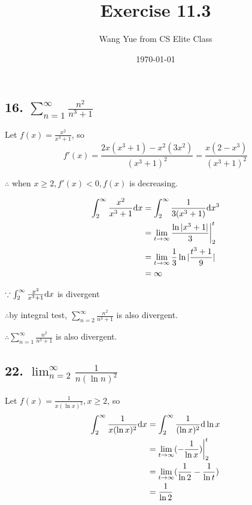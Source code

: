 \documentclass{article}
\begin{document}
    \title{Exercise 11.3}
    \author{Wang Yue from CS Elite Class}
    \date{\today}

    \maketitle

    \subsection*{16. $\sum_{n=1}^\infty \frac{n^2}{n^3+1}$}

    Let $f(x) = \frac{x^2}{x^3+1}$, so $$f'(x) = \frac{2x(x^3+1) - x^2(3x^2)}{(x^3+1)^2} = \frac{x(2-x^3)}{(x^3+1)^2}$$

    $\therefore$ when $x\geq 2, f'(x)<0, f(x)$ is decreasing.

    $$\begin{aligned}
    \int_2^\infty \frac{x^2}{x^3+1}\textrm dx &= \int_2^\infty \frac{1}{3(x^3+1)}\textrm dx^3 \\
    &= \lim_{t\to\infty}\frac{\ln|x^3+1|}{3}\biggl|_2^t \\
    &= \lim_{t\to\infty} \frac{1}{3} \ln |\frac{t^3+1}{9}| \\
    &= \infty
    \end{aligned}$$

    $\because \int_2^\infty \frac{x^2}{x^3+1}\textrm dx$ is divergent

    $\therefore $by integral test, $\sum_{n=2}^\infty \frac{n^2}{n^3+1}$ is also divergent.

    $\therefore \sum_{n=1}^\infty \frac{n^2}{n^3+1}$ is also divergent.

    \subsection*{22. $\lim_{n=2}^\infty \frac{1}{n(\ln n)^2}$}

    Let $f(x) = \frac{1}{x(\ln x)^2}, x \geq 2$, so 
    $$\begin{aligned}
        \int_2^\infty \frac{1}{x(\ln x)^2} \textrm dx &= \int_2^\infty \frac{1}{(\ln x)^2}\textrm d\ln x \\
        &= \lim_{t\to\infty} (-\frac{1}{\ln x}) \biggl|_2^t \\
        &= \lim_{t\to\infty} (\frac{1}{\ln 2} - \frac{1}{\ln t}) \\
        &= \frac{1}{\ln 2}
    \end{aligned}$$
\end{document}
